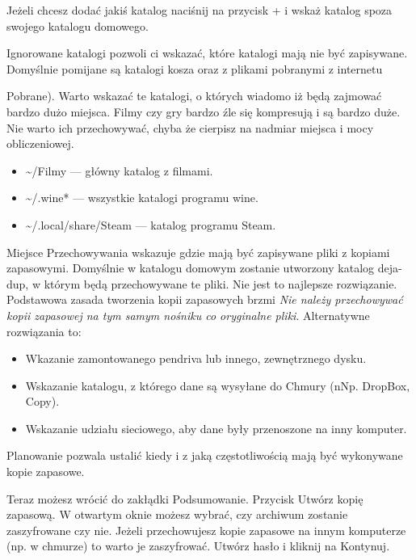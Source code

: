 Jeżeli chcesz dodać jakiś katalog naciśnij na przycisk \textcolor{ubuntu_orange}{+} i wskaż katalog spoza swojego katalogu domowego.

\textcolor{ubuntu_orange}{Ignorowane katalogi} pozwoli ci wskazać, które katalogi mają nie być zapisywane. Domyślnie pomijane są katalogi kosza oraz z plikami pobranymi z internetu {Pobrane). Warto wskazać te katalogi, o których wiadomo iż będą zajmować bardzo dużo miejsca. Filmy czy gry bardzo źle się kompresują i są bardzo duże. Nie warto ich przechowywać, chyba że cierpisz na nadmiar miejsca i mocy obliczeniowej.
\begin{itemize}
\item \textcolor{ubuntu_orange}{\textasciitilde /Filmy} --- główny katalog z filmami.
\item \textcolor{ubuntu_orange}{\textasciitilde /.wine*} --- wszystkie katalogi programu wine.
\item \textcolor{ubuntu_orange}{\textasciitilde /.local/share/Steam} --- katalog programu Steam.
\end{itemize}

\textcolor{ubuntu_orange}{Miejsce Przechowywania} wskazuje gdzie mają być zapisywane pliki z kopiami zapasowymi.  Domyślnie w katalogu domowym zostanie utworzony katalog \textcolor{ubuntu_orange}{deja-dup}, w którym będą przechowywane te pliki. Nie jest to najlepsze rozwiązanie. Podstawowa zasada tworzenia kopii zapasowych brzmi \emph{Nie należy przechowywać kopii zapasowej na tym samym nośniku co oryginalne pliki}. Alternatywne rozwiązania to:
\begin{itemize}
\item Wkazanie zamontowanego pendriva lub innego, zewnętrznego dysku.
\item Wskazanie katalogu, z którego dane są wysyłane do Chmury (nNp. DropBox, Copy).
\item Wskazanie udziału sieciowego, aby dane były przenoszone na inny komputer.
\end{itemize}

\textcolor{ubuntu_orange}{Planowanie} pozwala ustalić kiedy i z jaką częstotliwością mają być wykonywane kopie zapasowe.

Teraz możesz wrócić do zakłądki \textcolor{ubuntu_orange}{Podsumowanie}. Przycisk \textcolor{ubuntu_orange}{Utwórz kopię zapasową}. W otwartym oknie możesz wybrać, czy archiwum zostanie zaszyfrowane czy nie. Jeżeli przechowujesz kopie zapasowe na innym komputerze (np. w chmurze) to warto je zaszyfrować. Utwórz hasło i kliknij na \textcolor{ubuntu_orange}{Kontynuj}.

}
